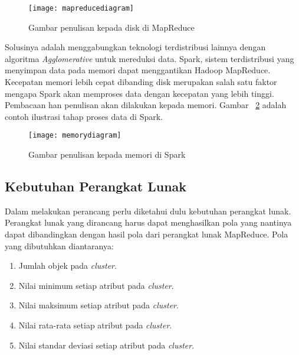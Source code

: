 \begin{figure}[H]
    \centering  
    \texttt{[image: mapreducediagram]}  
    \caption[Gambar penulisan kepada disk di MapReduce]{Gambar penulisan kepada disk di MapReduce} 
    \label{fig:mapreducediagram} 
\end{figure}


Solusinya adalah menggabungkan teknologi terdistribusi lainnya dengan  algoritma \textit{Agglomerative} untuk mereduksi data. Spark, sistem terdistribusi yang menyimpan data pada memori dapat menggantikan Hadoop MapReduce. Kecepatan memori lebih cepat dibanding disk merupakan salah satu faktor mengapa Spark akan memproses data dengan kecepatan yang lebih tinggi.  Pembacaan han penulisan akan dilakukan kepada memori. Gambar ~\ref{fig:memorydiagram} adalah contoh ilustrasi tahap proses data di Spark. 
	
\begin{figure}[H]
    \centering  
    \texttt{[image: memorydiagram]}  
    \caption[Gambar penulisan kepada memori di Spark]{Gambar penulisan kepada memori di Spark} 
    \label{fig:memorydiagram} 
\end{figure}

\subsection{Kebutuhan Perangkat Lunak}

Dalam melakukan perancang perlu diketahui dulu kebutuhan perangkat lunak. Perangkat lunak yang dirancang harus dapat menghasilkan pola yang nantinya dapat dibandingkan dengan hasil pola dari perangkat lunak MapReduce. Pola yang dibutuhkan diantaranya:

\begin{enumerate}

\item Jumlah objek pada \textit{cluster}.

\item Nilai minimum setiap atribut pada \textit{cluster}.

\item Nilai maksimum setiap atribut pada \textit{cluster}.

\item Nilai rata-rata setiap atribut pada \textit{cluster}.

\item Nilai standar deviasi setiap atribut pada \textit{cluster}.
\end{enumerate}
 
